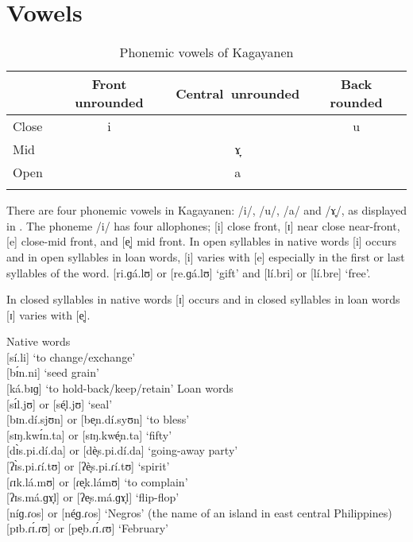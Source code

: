 \newpage
\section{Vowels} 
\label{bkm:Ref360478150}
\begin{table}[b]
\caption{Phonemic vowels of Kagayanen}
\label{tab2.7}
\begin{tabular}{lccc}
\lsptoprule
 & Front unrounded & Central~unrounded & Back rounded \\
\midrule
Close & i
  &  & u \\
Mid &  & ɤ̞ & \\
Open &  & a & \\
\lspbottomrule
\end{tabular}
\end{table}


There are four phonemic vowels in Kagayanen: /i/, /u/, /a/ and /ɤ̞/, as displayed in . The phoneme /i/ has four allophones; [i] close front, [ɪ] near close near-front, [e] close-mid front, and [e̞] mid front. In open syllables in native words [i] occurs and in open syllables in loan words, [i] varies with [e] especially in the first or last syllables of the word. [ri.ɡá.lʊ] or [re.ɡá.lʊ] ‘gift’ and [lí.bri] or [lí.bre] ‘free’.


In closed syllables in native words [ɪ] occurs and in closed syllables in loan words [ɪ] varies with [e̞].

\ea
Native words \\
{}[sí.li] ‘to change/exchange’ \\
{}[bɪ́n.ni] ‘seed grain’ \\
{}[ká.bɪɡ] ‘to hold-back/keep/retain’
\ex
Loan words \\
{}[sɪ́l.jʊ] or [sé̞l.jʊ] ‘seal’ \\
{}[bɪn.dí.sjʊn] or [be̞n.dí.syʊn] ‘to bless’ \\
{}[sɪŋ.kwɪ́n.ta] or [sɪŋ.kwé̞n.ta] ‘fifty’ \\
{}[dɪ̀s.pi.dí.da] or [dè̞s.pi.dí.da] ‘going-away party’ \\
{}[ʔɪ̀s.pi.ɾí.tʊ] or [ʔè̞s.pi.ɾí.tʊ] ‘spirit’ \\
{}[ɾɪk.lá.mʊ] or [ɾe̞k.lámʊ] ‘to complain’ \\
{}[ʔɪs.má.ɡɤ̞l] or [ʔe̞s.má.ɡɤ̞l] ‘flip-flop' \\
{}[níɡ.ɾos] or [né̞ɡ.ɾos] ‘Negros' (the name of an island in east central Philippines) \\
{}[pɪb.ɾɪ́.ɾʊ] or [pe̞b.ɾɪ́.ɾʊ] ‘February’
\z

